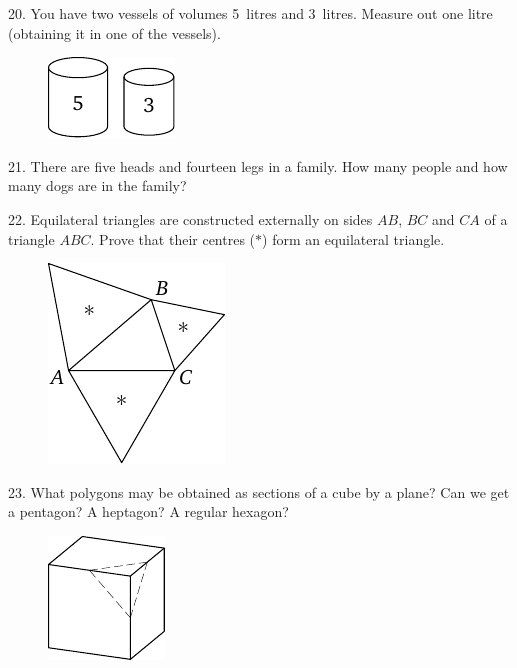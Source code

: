 \begin{problem}{20.}
	You have two vessels of volumes 5~litres and 3~litres. Measure out one litre (obtaining it in one of the vessels).
	\begin{figure}
		\includegraphics{taskbook-4}
	\end{figure}
\end{problem}

\begin{problem}{21.}
	There are five heads and fourteen legs in a family. How many people and how many dogs are in the family?
\end{problem}

\begin{problem}{22.}
	Equilateral triangles are constructed externally on sides $AB$, $BC$ and $CA$ of a triangle $ABC$.
	Prove that their centres ($*$) form an equilateral triangle.
	\begin{figure}
		\includegraphics{taskbook-6}
	\end{figure}
\end{problem}

\begin{problem}{23.}
	What polygons may be obtained as sections of a cube by a plane? Can we get a pentagon? A heptagon?
	A regular hexagon?
	\begin{figure}
		\includegraphics{taskbook-7}
	\end{figure}
\end{problem}


